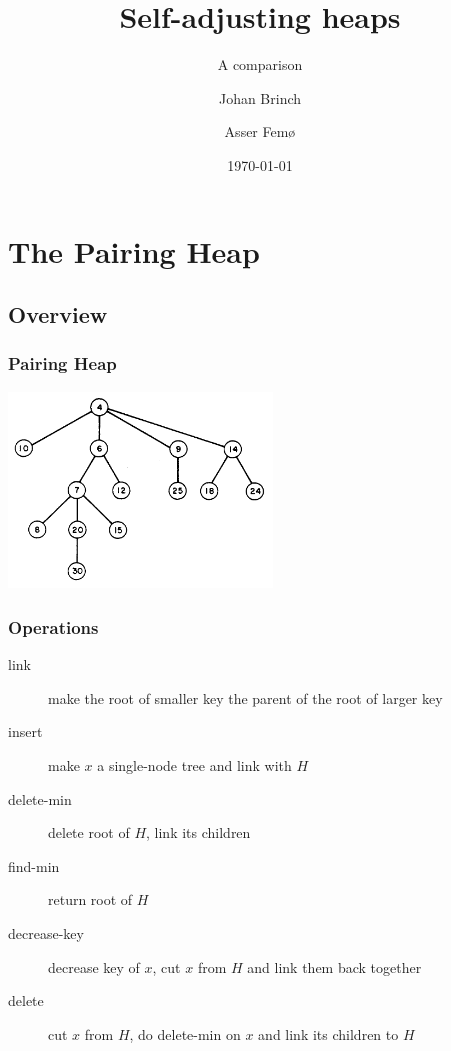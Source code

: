 \documentclass{beamer}
\title{Self-adjusting heaps}
\subtitle{A comparison}
\author{Johan Brinch \and Asser Femø}
\date{\today}
\begin{document}
\lstset{basicstyle=\footnotesize\ttfamily}
\begin{frame}
  \titlepage
\end{frame}
 
\section{The Pairing Heap}
\subsection{Overview}
\begin{frame}[fragile]
\frametitle{Pairing Heap}

\includegraphics[width=7cm]{../pairing-heap-slides/fig1.png}

\end{frame}

\begin{frame}
\frametitle{Operations}

\begin{description}
\item[link] make the root of smaller key the parent of the root of larger key
\item[insert] make $x$ a single-node tree and link with $H$
\item[delete-min] delete root of $H$, link its children
\item[find-min] return root of $H$
\item[decrease-key] decrease key of $x$, cut $x$ from $H$ and link them
back together
\item[delete] cut $x$ from $H$, do delete-min on $x$ and link its children to $H$
\end{description}

\end{frame}
\end{document}
